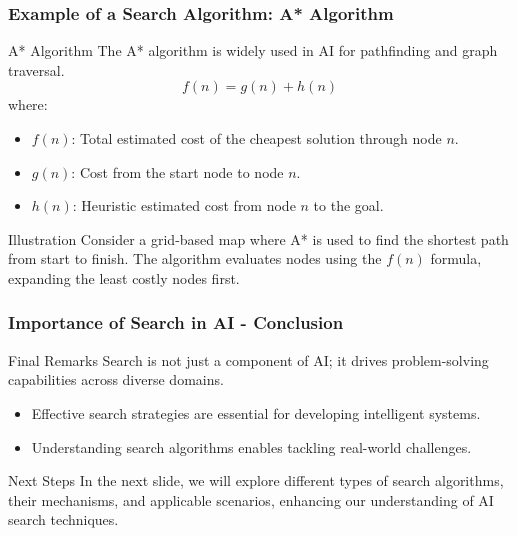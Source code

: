 \documentclass[aspectratio=169]{beamer}
\begin{document}
\begin{frame}[fragile]
    \frametitle{Example of a Search Algorithm: A* Algorithm}
    \begin{block}{A* Algorithm}
        The A* algorithm is widely used in AI for pathfinding and graph traversal.
        \begin{equation}
            f(n) = g(n) + h(n)
        \end{equation}
        where:
        \begin{itemize}
            \item $f(n)$: Total estimated cost of the cheapest solution through node $n$.
            \item $g(n)$: Cost from the start node to node $n$.
            \item $h(n)$: Heuristic estimated cost from node $n$ to the goal.
        \end{itemize}
    \end{block}
    
    \begin{block}{Illustration}
        Consider a grid-based map where A* is used to find the shortest path from start to finish. The algorithm evaluates nodes using the $f(n)$ formula, expanding the least costly nodes first.
    \end{block}
\end{frame}

\begin{frame}[fragile]
    \frametitle{Importance of Search in AI - Conclusion}
    \begin{block}{Final Remarks}
        Search is not just a component of AI; it drives problem-solving capabilities across diverse domains. 
        \begin{itemize}
            \item Effective search strategies are essential for developing intelligent systems.
            \item Understanding search algorithms enables tackling real-world challenges.
        \end{itemize}
    \end{block}
    
    \begin{block}{Next Steps}
        In the next slide, we will explore different types of search algorithms, their mechanisms, and applicable scenarios, enhancing our understanding of AI search techniques.
    \end{block}
\end{frame}
\end{document}

